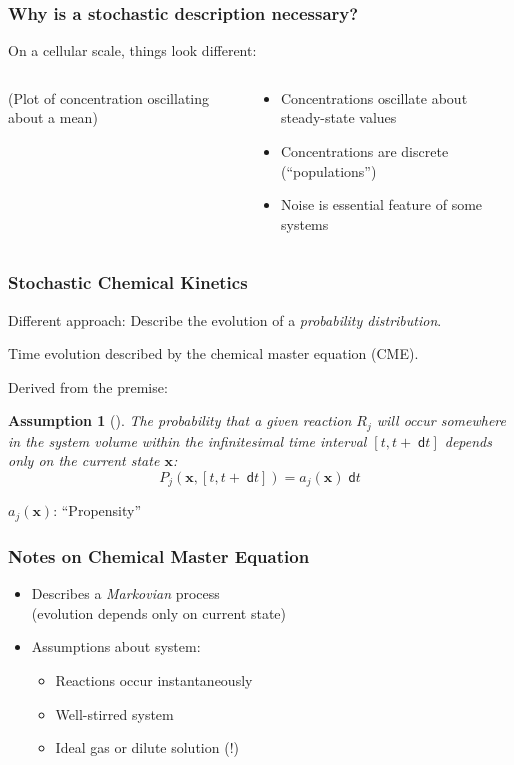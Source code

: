 \documentclass[xcolor={usenames,dvipsnames,svgnames}]{beamer}
\newcommand{\dee}{\;\mathsf{d}}
\renewcommand{\vec}[1]{\ensuremath{\mathbf{#1}}}
\newtheorem{assumption}{Assumption}
\begin{document}
\begin{frame}
    \frametitle{Why is a stochastic description necessary?}
    On a cellular scale, things look different:
    \hfill
    \begin{columns}[c]
        \begin{column}{0.5\textwidth}
            (Plot of concentration oscillating about a mean)
        \end{column}
        \begin{column}{0.5\textwidth}
            \begin{itemize}
                \item Concentrations oscillate about steady-state values
                \item Concentrations are discrete (``populations'')
                \item Noise is essential feature of some systems
            \end{itemize}
        \end{column}
    \end{columns}
\end{frame}

\begin{frame}
    \frametitle{Stochastic Chemical Kinetics}
    Different approach: Describe the evolution of a \emph{probability distribution}.
    
    Time evolution described by the chemical master equation (CME).
    \pause

    Derived from the premise:
    \begin{assumption}[\cite{gillespie-07}]
        The probability that a given reaction $R_j$ will occur somewhere in the system volume within the infinitesimal time interval $[t, t+\dee t]$ depends only on the current state $\vec{x}$:
        \[
            P_j(\vec{x}, [t, t+\dee t]) = a_j(\vec{x})\dee t
        \]
    \end{assumption}

    $a_j(\vec{x})$: ``Propensity''
\end{frame}

\begin{frame}
    \frametitle{Notes on Chemical Master Equation}
    \begin{itemize}
        \item Describes a \emph{Markovian} process\\
            (evolution depends only on current state)

        \item Assumptions about system:
        \begin{itemize}
            \item Reactions occur instantaneously
            \item Well-stirred system
            \item Ideal gas or dilute solution (!)
        \end{itemize}
    \end{itemize}
\end{frame}
\end{document}
